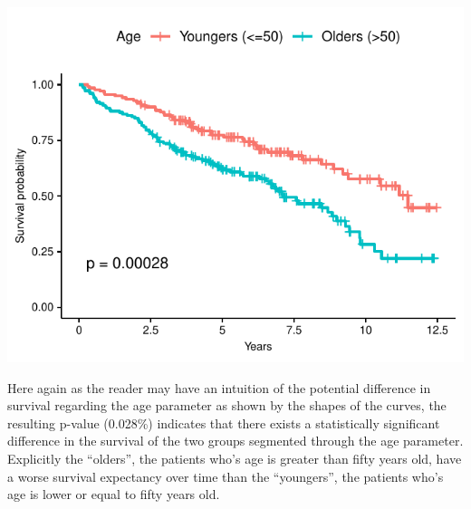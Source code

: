 \documentclass[]{article}
\newenvironment{Shaded}{\begin{snugshade}}{\end{snugshade}}
\newcommand{\KeywordTok}[1]{\textcolor[rgb]{0.13,0.29,0.53}{\textbf{#1}}}
\newcommand{\DataTypeTok}[1]{\textcolor[rgb]{0.13,0.29,0.53}{#1}}
\newcommand{\DecValTok}[1]{\textcolor[rgb]{0.00,0.00,0.81}{#1}}
\newcommand{\StringTok}[1]{\textcolor[rgb]{0.31,0.60,0.02}{#1}}
\newcommand{\CommentTok}[1]{\textcolor[rgb]{0.56,0.35,0.01}{\textit{#1}}}
\newcommand{\OperatorTok}[1]{\textcolor[rgb]{0.81,0.36,0.00}{\textbf{#1}}}
\newcommand{\NormalTok}[1]{#1}
\begin{document}
\begin{Shaded}
\end{Shaded}

\includegraphics{survival_v5_files/figure-latex/unnamed-chunk-19-1.pdf}

Here again as the reader may have an intuition of the potential
difference in survival regarding the age parameter as shown by the
shapes of the curves, the resulting p-value (0.028\%) indicates that
there exists a statistically significant difference in the survival of
the two groups segmented through the age parameter. Explicitly the
``olders'', the patients who's age is greater than fifty years old, have
a worse survival expectancy over time than the ``youngers'', the
patients who's age is lower or equal to fifty years old.
\end{document}
